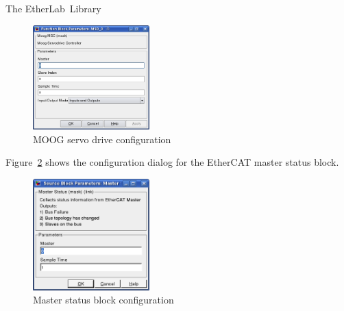 \begin{ighsec}{The EtherLab\regTM\ Library}
\begin{figure}[H]
  \begin{center}
    \includegraphics[width=0.4\textwidth]{images/moog_msd.png}
    \caption{MOOG servo drive configuration}
    \label{fig:msd}
  \end{center}
\end{figure}

Figure~\ref{fig:masterstats} shows the configuration dialog for the EtherCAT
master status block.

\begin{figure}[H]
  \begin{center}
    \includegraphics[width=0.4\textwidth]{images/master.png}
    \caption{Master status block configuration}
    \label{fig:masterstats}
  \end{center}
\end{figure}

\end{ighsec}


